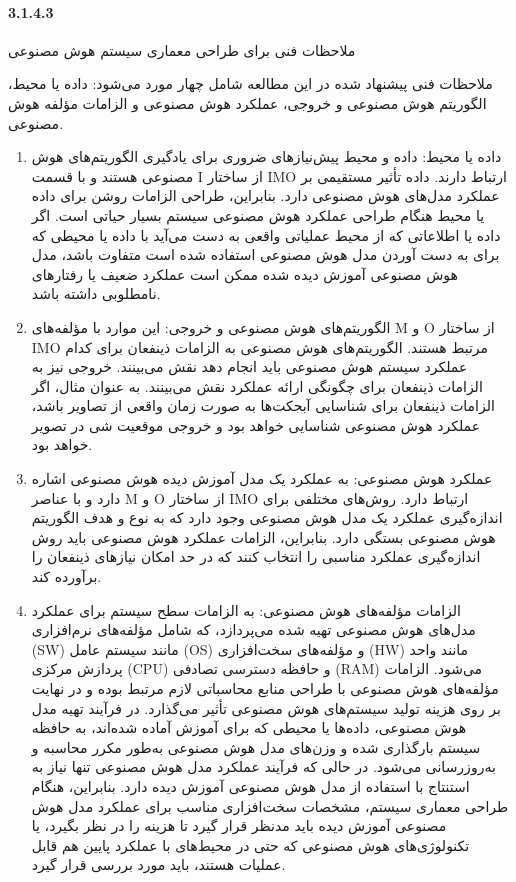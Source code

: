 \documentclass[a4paper,10pt]{article}
\begin{document}
        \paragraph{3.1.4.3}{ملاحظات فنی برای طراحی معماری سیستم هوش مصنوعی}

            ملاحظات فنی پیشنهاد شده در این مطالعه شامل چهار مورد می‌شود: داده یا محیط، الگوریتم هوش مصنوعی و خروجی، عملکرد هوش مصنوعی و الزامات مؤلفه هوش مصنوعی.

            \begin{enumerate}
                
                \item داده یا محیط: داده و محیط پیش‌نیازهای ضروری برای یادگیری الگوریتم‌های هوش مصنوعی هستند و با قسمت I از ساختار IMO ارتباط دارند. داده تأثیر مستقیمی بر عملکرد مدل‌های هوش مصنوعی دارد. بنابراین، طراحی الزامات روشن برای داده یا محیط هنگام طراحی عملکرد هوش مصنوعی سیستم بسیار حیاتی است. اگر داده یا اطلاعاتی که از محیط عملیاتی واقعی به دست می‌آید با داده یا محیطی که برای به دست آوردن مدل هوش مصنوعی استفاده شده است متفاوت باشد، مدل هوش مصنوعی آموزش دیده شده ممکن است عملکرد ضعیف یا رفتارهای نامطلوبی داشته باشد.

                \item الگوریتم‌های هوش مصنوعی و خروجی: این موارد با مؤلفه‌های M و O از ساختار IMO مرتبط هستند. الگوریتم‌های هوش مصنوعی به الزامات ذینفعان برای کدام عملکرد سیستم هوش مصنوعی باید انجام دهد نقش می‌بینند. خروجی نیز به الزامات ذینفعان برای چگونگی ارائه عملکرد نقش می‌بینند. به عنوان مثال، اگر الزامات ذینفعان برای شناسایی آبجکت‌ها به صورت زمان واقعی از تصاویر باشد، عملکرد هوش مصنوعی شناسایی خواهد بود و خروجی موقعیت شی در تصویر خواهد بود.

                \item عملکرد هوش مصنوعی: به عملکرد یک مدل آموزش دیده هوش مصنوعی اشاره دارد و با عناصر M و O از ساختار IMO ارتباط دارد. روش‌های مختلفی برای اندازه‌گیری عملکرد یک مدل هوش مصنوعی وجود دارد که به نوع و هدف الگوریتم هوش مصنوعی بستگی دارد. بنابراین، الزامات عملکرد هوش مصنوعی باید روش اندازه‌گیری عملکرد مناسبی را انتخاب کنند که در حد امکان نیازهای ذینفعان را برآورده کند.

                \item الزامات مؤلفه‌های هوش مصنوعی: به الزامات سطح سیستم برای عملکرد مدل‌های هوش مصنوعی تهیه شده می‌پردازد، که شامل مؤلفه‌های نرم‌افزاری (SW) مانند سیستم عامل (OS) و مؤلفه‌های سخت‌افزاری (HW) مانند واحد پردازش مرکزی (CPU) و حافظه دسترسی تصادفی (RAM) می‌شود. الزامات مؤلفه‌های هوش مصنوعی با طراحی منابع محاسباتی لازم مرتبط بوده و در نهایت بر روی هزینه تولید سیستم‌های هوش مصنوعی تأثیر می‌گذارد. در فرآیند تهیه مدل هوش مصنوعی، داده‌ها یا محیطی که برای آموزش آماده شده‌اند، به حافظه سیستم بارگذاری شده و وزن‌های مدل هوش مصنوعی به‌طور مکرر محاسبه و به‌روزرسانی می‌شود. در حالی که فرآیند عملکرد مدل هوش مصنوعی تنها نیاز به استنتاج با استفاده از مدل هوش مصنوعی آموزش دیده دارد. بنابراین، هنگام طراحی معماری سیستم، مشخصات سخت‌افزاری مناسب برای عملکرد مدل هوش مصنوعی آموزش دیده باید مدنظر قرار گیرد تا هزینه را در نظر بگیرد، یا تکنولوژی‌های هوش مصنوعی که حتی در محیط‌های با عملکرد پایین هم قابل عملیات هستند، باید مورد بررسی قرار گیرد.

            \end{enumerate}
        
\end{document}
